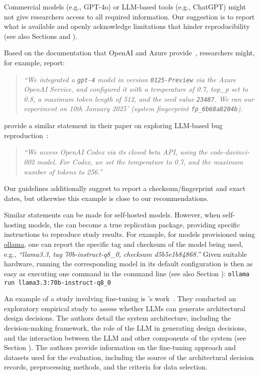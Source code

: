 \modelversionsummary

Commercial models (e.g., GPT-4o) or LLM-based tools (e.g., ChatGPT) might not give researchers access to all required information.
Our suggestion is to report what is available and openly acknowledge limitations that hinder reproducibility (see also Sections \prompts and \limitationsmitigations).


Based on the documentation that OpenAI and Azure provide~\cite{OpenAI25, Azure25}, researchers might, for example, report:

\begin{quote}
\small
\it
 ``We integrated a  \texttt{gpt-4} model in version \texttt{0125-Preview} via the Azure OpenAI Service, and configured it with a temperature of 0.7, top\_p set to 0.8, a maximum token length of 512, and the  seed value \texttt{23487}.
 We ran our experiment on 10th January 2025' (system fingerprint \texttt{fp\_6b68a8204b}).
\end{quote}

\citeauthor{DBLP:conf/icse/KangYY23} provide a similar statement in their paper on exploring LLM-based bug reproduction~\cite{DBLP:conf/icse/KangYY23}:

\begin{quote}
\small
\it
``We access OpenAI Codex via its closed beta API, using the code-davinci-002 model. For Codex, we set the temperature to 0.7, and the maximum number of tokens to 256.''
\end{quote}

Our guidelines additionally suggest to report a checksum/fingerprint and exact dates, but otherwise this example is close to our recommendations. 

Similar statements can be made for self-hosted models.
However, when self-hosting models, the \supplementarymaterial can become a true replication package, providing specific instructions to reproduce study results.
For example, for models provisioned using \href{https://ollama.com/library/}{ollama}, one can report the specific tag and checksum of the model being used, e.g., \emph{``llama3.3, tag 70b-instruct-q8\_0, checksum d5b5e1b84868.''}
Given suitable hardware, running the corresponding model in its default configuration is then as easy as executing one command in the command line (see also Section \openllm):
\texttt{ollama run llama3.3:70b-instruct-q8\_0}

An example of a study involving fine-tuning is \citeauthor{DBLP:conf/icsa/DharVV24}'s work~\cite{DBLP:conf/icsa/DharVV24}.
They conducted an exploratory empirical study to assess whether LLMs can generate architectural design decisions.
The authors detail the system architecture, including the decision-making framework, the role of the LLM in generating design decisions, and the interaction between the LLM and other components of the system (see Section \toolarchitecture).
The authors provide information on the fine-tuning approach and datasets used for the evaluation, including the source of the architectural decision records, preprocessing methods, and the criteria for data selection. 

